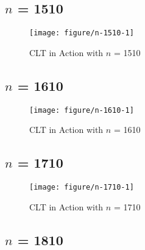 \documentclass[11pt,letter]{article}\usepackage[]{graphicx}\usepackage[]{color}
\makeatletter
\def\maxwidth{ %
  \ifdim\Gin@nat@width>\linewidth
    \linewidth
  \else
    \Gin@nat@width
  \fi
}
\newenvironment{knitrout}{}{} %
\makeatother
\begin{document}
\subsection{$n$ = 1510}

\begin{knitrout}
\color{fgcolor}\begin{figure}[h]

{\centering \texttt{[image: figure/n-1510-1]} 

}

\caption[CLT in Action with $n$ = 1510]{CLT in Action with $n$ = 1510}\label{fig:n-1510}
\end{figure}


\end{knitrout}
\newpage
\subsection{$n$ = 1610}

\begin{knitrout}
\color{fgcolor}\begin{figure}[h]

{\centering \texttt{[image: figure/n-1610-1]} 

}

\caption[CLT in Action with $n$ = 1610]{CLT in Action with $n$ = 1610}\label{fig:n-1610}
\end{figure}


\end{knitrout}
\newpage
\subsection{$n$ = 1710}

\begin{knitrout}
\color{fgcolor}\begin{figure}[h]

{\centering \texttt{[image: figure/n-1710-1]} 

}

\caption[CLT in Action with $n$ = 1710]{CLT in Action with $n$ = 1710}\label{fig:n-1710}
\end{figure}


\end{knitrout}
\newpage
\subsection{$n$ = 1810}
\end{document}
